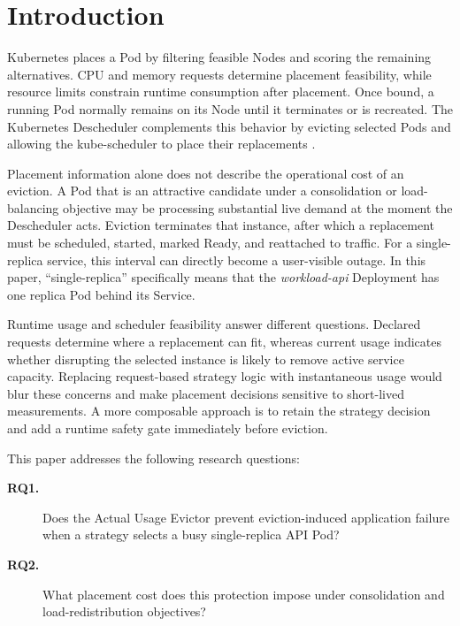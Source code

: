 \section{Introduction}
\label{sec:introduction}

Kubernetes places a Pod by filtering feasible Nodes and scoring the remaining
alternatives. CPU and memory requests determine placement feasibility, while
resource limits constrain runtime consumption after placement. Once bound, a
running Pod normally remains on its Node until it terminates or is recreated.
The Kubernetes Descheduler complements this behavior by evicting selected Pods
and allowing the kube-scheduler to place their replacements
\citep{k8s_descheduler_docs,larsson_klein_elmroth_2023}.

Placement information alone does not describe the operational cost of an
eviction. A Pod that is an attractive candidate under a consolidation or
load-balancing objective may be processing substantial live demand at the
moment the Descheduler acts. Eviction terminates that instance, after which a
replacement must be scheduled, started, marked Ready, and reattached to
traffic. For a single-replica service, this interval can directly become a
user-visible outage. In this paper, ``single-replica'' specifically means that
the \textit{workload-api} Deployment has one replica Pod behind its Service.

Runtime usage and scheduler feasibility answer different questions. Declared
requests determine where a replacement can fit, whereas current usage
indicates whether disrupting the selected instance is likely to remove active
service capacity. Replacing request-based strategy logic with instantaneous
usage would blur these concerns and make placement decisions sensitive to
short-lived measurements. A more composable approach is to retain the strategy
decision and add a runtime safety gate immediately before eviction.

This paper addresses the following research questions:

\begin{description}
    \item[\textbf{RQ1.}] Does the Actual Usage Evictor prevent
    eviction-induced application failure when a strategy selects a busy
    single-replica API Pod?
    \item[\textbf{RQ2.}] What placement cost does this protection impose under
    consolidation and load-redistribution objectives?
\end{description}

